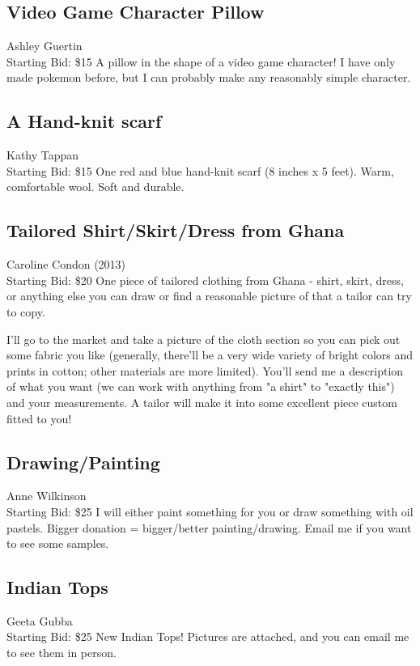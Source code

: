 \documentclass[11pt]{article}
\begin{document}
\subsection{Video Game Character Pillow}
Ashley Guertin
\\
Starting Bid: \$15
\newline
A pillow in the shape of a video game character! I have only made pokemon before, but I can probably make any reasonably simple character.
\subsection{A Hand-knit scarf}
Kathy Tappan
\\
Starting Bid: \$15
\newline
One red and blue hand-knit scarf (8 inches x 5 feet). Warm, comfortable wool. Soft and durable.
\subsection{Tailored Shirt/Skirt/Dress from Ghana}
Caroline Condon (2013)
\\
Starting Bid: \$20
\newline
One piece of tailored clothing from Ghana - shirt, skirt, dress, or anything else you can draw or find a reasonable picture of that a tailor can try to copy. 

I'll go to the market and take a picture of the cloth section so you can pick out some fabric you like (generally, there'll be a very wide variety of bright colors and prints in cotton; other materials are more limited). You'll send me a description of what you want (we can work with anything from "a shirt" to "exactly this") and your measurements. A tailor will make it into some excellent piece custom fitted to you!
\subsection{Drawing/Painting}
Anne Wilkinson
\\
Starting Bid: \$25
\newline
I will either paint something for you or draw something with oil pastels. Bigger donation = bigger/better painting/drawing. Email me if you want to see some samples.
\subsection{Indian Tops}
Geeta Gubba
\\
Starting Bid: \$25
\newline
New Indian Tops! Pictures are attached, and you can email me to see them in person. 
\end{document}
